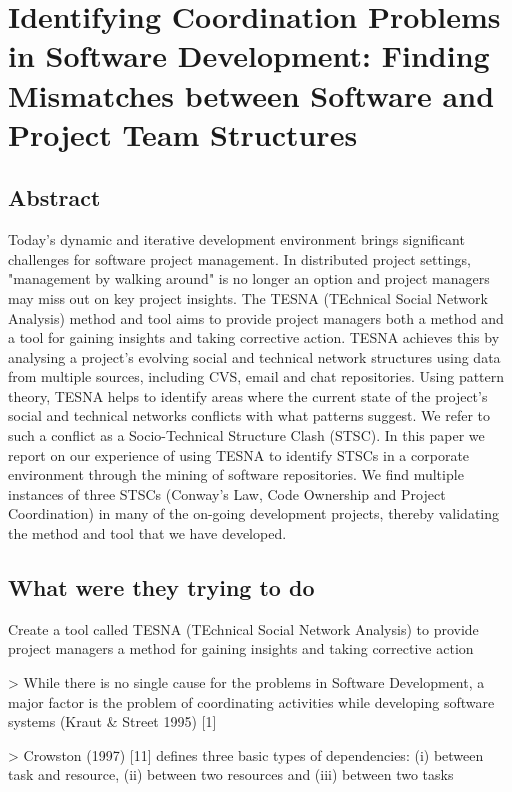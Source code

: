 
\section{Identifying Coordination Problems in Software Development: Finding Mismatches between Software and Project Team Structures}

\subsection{Abstract}

Today's dynamic and iterative development environment brings significant challenges for software project management. In distributed project settings, "management by walking around" is no longer an option and project managers may miss out on key project insights. The TESNA (TEchnical Social Network Analysis) method and tool aims to provide project managers both a method and a tool for gaining insights and taking corrective action. TESNA achieves this by analysing a project's evolving social and technical network structures using data from multiple sources, including CVS, email and chat repositories. Using pattern theory, TESNA helps to identify areas where the current state of the project's social and technical networks conflicts with what patterns suggest. We refer to such a conflict as a Socio-Technical Structure Clash (STSC). In this paper we report on our experience of using TESNA to identify STSCs in a corporate environment through the mining of software repositories. We find multiple instances of three STSCs (Conway's Law, Code Ownership and Project Coordination) in many of the on-going development projects, thereby validating the method and tool that we have developed.

\subsection{What were they trying to do}

Create a tool called TESNA (TEchnical Social Network Analysis) to provide project managers a method for gaining insights and taking corrective action

> While there is no single cause for the problems in Software Development, a major factor is the problem of coordinating activities while developing software systems (Kraut \& Street 1995) [1]

> Crowston (1997) [11] defines three basic types of dependencies: (i) between task and resource, (ii) between two resources and (iii) between two tasks

